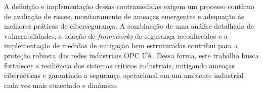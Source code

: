         A definição e implementação dessas contramedidas exigem um processo contínuo de avaliação de riscos, monitoramento de ameaças emergentes e adequação às melhores práticas de cibersegurança. A combinação de uma análise detalhada de vulnerabilidades, a adoção de \textit{frameworks} de segurança reconhecidos e a implementação de medidas de mitigação bem estruturadas contribui para a proteção robusta das redes industriais OPC UA. Dessa forma, este trabalho busca fortalecer a resiliência dos sistemas críticos industriais, mitigando ameaças cibernéticas e garantindo a segurança operacional em um ambiente industrial cada vez mais conectado e dinâmico.

